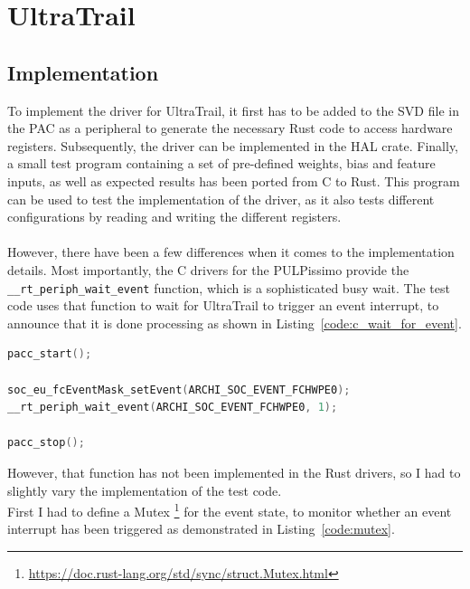 \begin{minipage}{\textwidth}
\section{UltraTrail}

\subsection{Implementation}

To implement the driver for UltraTrail, it first has to be added to the SVD file in the PAC
as a peripheral to generate the necessary Rust code to access hardware registers.
Subsequently, the driver can be implemented in the HAL crate.
Finally, a small test program containing a set of pre-defined
weights, bias and feature inputs, as well as expected results has been ported from C to Rust.
This program can be used to test the implementation of the driver, as it also
tests different configurations by reading and writing the different registers.
\\\\
However, there have been a few differences when it comes to the implementation details.
Most importantly, the C drivers for the PULPissimo provide the \lstinline{__rt_periph_wait_event} function,
which is a sophisticated busy wait.
The test code uses that function to wait for UltraTrail to trigger an event interrupt, to announce that
it is done processing as shown in Listing~\ref{code:c_wait_for_event}.
\end{minipage}

\begin{minipage}{\textwidth}
\begin{lstlisting}[style=colorEX,language=C,caption={Waiting for the event in C},label={code:c_wait_for_event}]
pacc_start();

soc_eu_fcEventMask_setEvent(ARCHI_SOC_EVENT_FCHWPE0);
__rt_periph_wait_event(ARCHI_SOC_EVENT_FCHWPE0, 1);

pacc_stop();
\end{lstlisting}
\end{minipage}

However, that function has not been implemented in the Rust drivers, so I had to slightly
vary the implementation of the test code.\\
First I had to define a Mutex \footnote{\url{https://doc.rust-lang.org/std/sync/struct.Mutex.html}}
for the event state, to monitor whether an event interrupt has been triggered as demonstrated
in Listing~\ref{code:mutex}.

